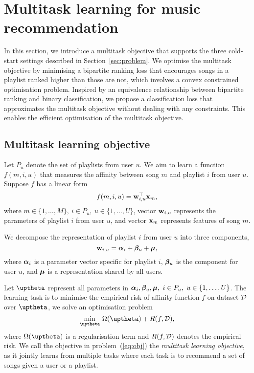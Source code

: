 \section{Multitask learning for music recommendation}
\label{sec:method}

In this section, we introduce a multitask objective that supports the three cold-start settings
described in Section~\ref{sec:problem}. 
We optimise the multitask objective by minimising a bipartite ranking loss that encourages songs in a playlist
ranked higher than those are not, which involves a convex constrained optimisation problem.
Inspired by an equivalence relationship between bipartite ranking and binary classification, 
we propose a classification loss that approximates the multitask objective without dealing with any constraints.
This enables the efficient optimisation of the multitask objective.



\subsection{Multitask learning objective}

Let $P_u$ denote the set of playlists from user $u$.
We aim to learn a function $f(m, i, u)$ that measures the affinity between song $m$ and playlist $i$ from user $u$.
Suppose $f$ has a linear form
\begin{equation}
\label{eq:scorefunc}
f(m, i, u) = \mathbf{w}_{i,u}^\top \mathbf{x}_m,
\end{equation}
where $m \in \{1,\dots,M\}, \ i \in P_u, \ u \in \{1,\dots,U\}$,
vector $\mathbf{w}_{i,u}$ represents the parameters of playlist $i$ from user $u$,
and vector $\mathbf{x}_m$ represents features of song $m$.

We decompose the representation of playlist $i$ from user $u$ %
into three components, \ie
$$
\mathbf{w}_{i,u} = {\bm{\alpha}}_i + {\bm{\beta}}_u + \bm{\mu},
$$
where ${\bm{\alpha}}_i$ is a parameter vector specific for playlist $i$,
${\bm{\beta}}_u$ is the component for user $u$,
and $\bm{\mu}$ is a representation shared by all users.

Let $\upthetabm$ represent all parameters in $\alphabm_i, \betabm_u, \bmu, \ i \in P_u, \ u \in \{1,\dots,U\}$.
The learning task is to minimise the empirical risk of affinity function $f$ on dataset $\mathcal{D}$ over $\upthetabm$,
\ie we solve an optimisation problem
\begin{equation}
\label{eq:obj}
\min_{\upthetabm} \, \Omega(\upthetabm) + R(f, \DCal),
\end{equation}
where $\Omega(\upthetabm)$ is a regularisation term and $R(f, \mathcal{D})$ denotes the empirical risk.
We call the objective in problem~(\ref{eq:obj}) the {\it multitask learning objective},
as it jointly learns from multiple tasks where each task is to recommend a set of songs given a user or a playlist.

